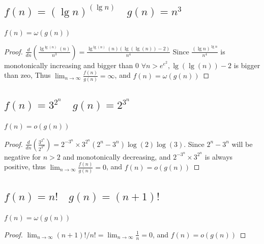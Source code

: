 \documentclass[a4paper]{article}
\begin{document}
\subsection{$f(n)=(\lg n)^{(\lg n)}  \quad  g(n)=n^3$}
$f(n)=\omega(g(n))$
\begin{proof}
        $\frac{d}{d n}\left(\frac{\lg ^{\lg (n)}(n)}{n^3}\right)=\frac{\lg ^{\lg (n)}(n)(\lg (\lg (n))-2)}{n^4}$ Since $\frac {(\lg n)^{\lg n}}{n^{4}}$ is monotonically increasing and bigger than 0 $\forall n > e^e^2, \lg (\lg (n))-2$ is bigger than zeo, Thus $\lim _{n \rightarrow \infty} \frac{f(n)}{g(n)}=\infty$, and $f(n)=\omega(g(n))$
\end{proof}

\subsection{$f(n)=3^ {2^ n } \quad  g(n)=2^ {3^ n} $}
$f(n)=o(g(n))$
\begin{proof}
$\frac{d}{d n}\left(\frac{3^{2^n}}{2^{3^n}}\right)=2^{-3^n} \times 3^{2^n}\left(2^n-3^n\right) \log (2) \log (3)$. Since $2^n-3^n$ will be negative for $n>2$ and monotonically decreasing, and $2^{-3^n} \times 3^{2^n}$ is always positive, thus $\lim _{n \rightarrow \infty} \frac{f(n)}{g(n)}=0$, and $f(n)=o(g(n))$
\end{proof}

\subsection{$f(n)=n !  \quad  g(n)=(n+1) !$}
$f(n)=\omega(g(n))$
\begin{proof}
  $\lim _{n \rightarrow \infty} (n+1) ! /n !=\lim _{n \rightarrow \infty} \frac1n=0$, and $f(n)=o(g(n))$
\end{proof}
\end{document}
